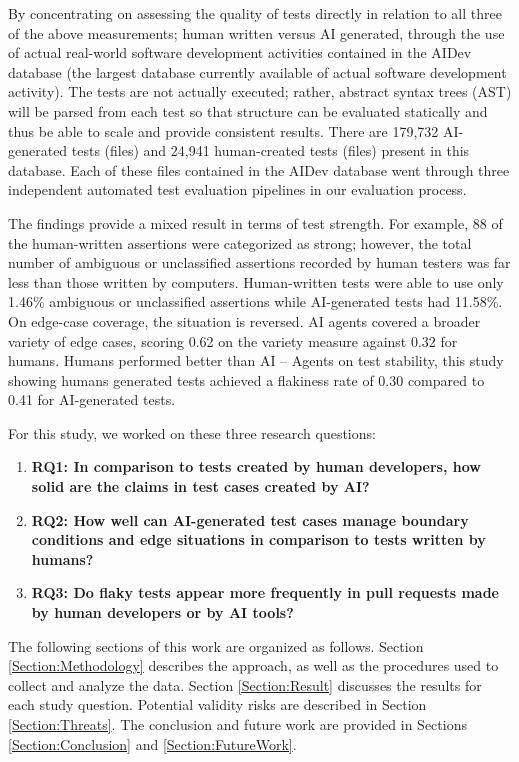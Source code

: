 \documentclass[conference]{IEEEtran}
\begin{document}
By concentrating on assessing the quality of tests directly in relation to all three of the above measurements; human written versus AI generated, through the use of actual real-world software development activities contained in the AIDev database (the largest database currently available of actual software development activity). The tests are not actually executed; rather, abstract syntax trees (AST) will be parsed from each test so that structure can be evaluated statically and thus be able to scale and provide consistent results. There are 179,732 AI-generated tests (files) and 24,941 human-created tests (files) present in this database. Each of these files contained in the AIDev database went through three independent automated test evaluation pipelines in our evaluation process.

The findings provide a mixed result in terms of test strength. For example, 88 of the human-written assertions were categorized as strong; however, the total number of ambiguous or unclassified assertions recorded by human testers was far less than those written by computers. Human-written tests were able to use only 1.46\% ambiguous or unclassified assertions while AI-generated tests had 11.58\%. On edge-case coverage, the situation is reversed. AI agents covered a broader variety of edge cases, scoring 0.62 on the variety measure against 0.32 for humans. Humans performed better than AI – Agents on test stability, this study showing humans generated tests achieved a flakiness rate of 0.30 compared to 0.41 for AI-generated tests.

For this study, we worked on these three research questions:
\begin{enumerate}
    \item \textbf{RQ1: In comparison to tests created by human developers, how solid are the claims in test cases created by AI?}
    \item \textbf{RQ2: How well can AI-generated test cases manage boundary conditions and edge situations in comparison to tests written by humans?}
    \item \textbf{RQ3: Do flaky tests appear more frequently in pull requests made by human developers or by AI tools?}
\end{enumerate}
The following sections of this work are organized as follows. Section \ref{Section:Methodology} describes the approach, as well as the procedures used to collect and analyze the data. Section \ref{Section:Result} discusses the results for each study question. Potential validity risks are described in Section \ref{Section:Threats}. The conclusion and future work are provided in Sections \ref{Section:Conclusion} and \ref{Section:FutureWork}.
\end{document}
